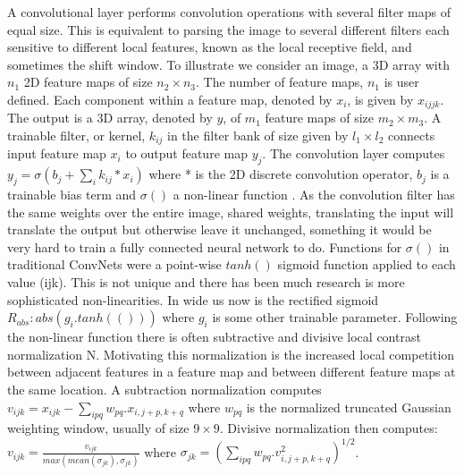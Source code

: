 A convolutional layer performs convolution operations with several filter maps of equal size.
This is equivalent to parsing the image to several different filters each sensitive to different local features, known as the local receptive field, and sometimes the shift window\citep{lecun2010convolutional}\citep{mo2012survey}.
To illustrate we consider an image, a 3D array with $n_1$ 2D feature maps of size $n_2 \times n_3$.
The number of feature maps, $n_1$ is user defined.
Each component within a feature map, denoted by $x_i$, is given by $x_{ijjk}$.
The output is a 3D array, denoted by $y$, of $m_1$ feature maps of size $m_2 \times m_3$. 
A trainable filter, or kernel, $k_{ij}$ in the filter bank of size given by $l_1 \times l_2$ connects input feature map $x_i$ to output feature map $y_j$.
The convolution layer computes $y_j=\sigma(b_j+\sum_i k_{ij}*x_i)$ where * is the 2D discrete convolution operator, $b_j$ is a trainable bias term and $\sigma()$ a non-linear function \citep{lecun2010convolutional}\citep{mo2012survey}\citep{chen2014big} .
As the convolution filter has the same weights over the entire image, shared weights, translating the input will translate the output but otherwise leave it unchanged, something it would be very hard to train a fully connected neural network to do.
Functions for $\sigma()$ in traditional ConvNets were a point-wise $tanh()$ sigmoid function applied to each value (ijk).
This is not unique and there has been much research is more sophisticated non-linearities.
In wide us now is the rectified sigmoid $R_{abs}: abs(g_i.tanh(()))$ where $g_i$ is some other trainable parameter\citep{lecun2010convolutional}.
Following the non-linear function there is often subtractive and divisive local contrast normalization N\citep{lecun2010convolutional}.
Motivating this normalization is the increased local competition between adjacent features in a  feature map and between different feature maps at the same location\citep{lecun2010convolutional}.
A subtraction normalization computes $v_{ijk}=x_{ijk} - \sum_{ipq} w_{pq}.x_{i,j+p,k+q}$ where $w_{pq}$ is the normalized truncated Gaussian weighting window, usually of size $9\times 9$. 
Divisive normalization then computes: $v_{ijk}=\frac{v_{ijk}}{max(mean(\sigma_{jk}),\sigma_{jk})}$
where $\sigma_{jk}=(\sum_{ipq}w_{pq}.v_{i,j+p,k+q}^2)^{1/2}$.


